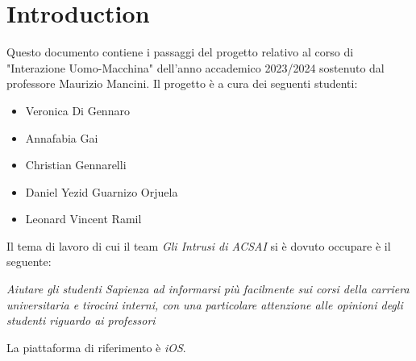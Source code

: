 \chapter*{Introduction}
\setcounter{page}{0}
  

Questo documento contiene i passaggi del progetto relativo
al corso di "Interazione Uomo-Macchina" dell'anno accademico 
2023/2024 sostenuto dal professore Maurizio Mancini.
Il progetto è a cura dei seguenti studenti:
\begin{itemize}
    \item Veronica Di Gennaro
    \item Annafabia Gai
    \item Christian Gennarelli
    \item Daniel Yezid Guarnizo Orjuela
    \item Leonard Vincent Ramil
\end{itemize}

Il tema di lavoro di cui il team \textit{Gli Intrusi di ACSAI} 
si è dovuto occupare è il seguente:
\begin{center}
    \textit{Aiutare gli studenti Sapienza ad informarsi più facilmente sui corsi della carriera universitaria e tirocini interni, con una particolare attenzione alle opinioni degli studenti riguardo ai professori}
\end{center}
La piattaforma di riferimento è \textit{iOS}.

